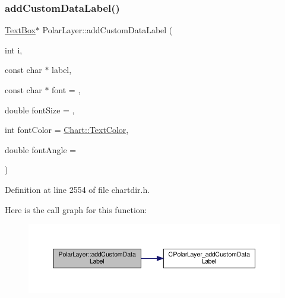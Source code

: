 \subsubsection{\texorpdfstring{add\+Custom\+Data\+Label()}{addCustomDataLabel()}}
{\footnotesize\ttfamily \hyperlink{class_text_box}{Text\+Box}$\ast$ Polar\+Layer\+::add\+Custom\+Data\+Label (\begin{DoxyParamCaption}\item[{int}]{i,  }\item[{const char $\ast$}]{label,  }\item[{const char $\ast$}]{font = {},  }\item[{double}]{font\+Size = {},  }\item[{int}]{font\+Color = {\ttfamily \hyperlink{namespace_chart_abee0d882fdc9ad0b001245ad9fc64011a879e14f2f5024caccc047374342321ef}{Chart\+::\+Text\+Color}},  }\item[{double}]{font\+Angle = {} }\end{DoxyParamCaption})\hspace{0.3cm}{\ttfamily [inline]}}



Definition at line 2554 of file chartdir.\+h.

Here is the call graph for this function\+:
\nopagebreak
\begin{figure}[H]
\begin{center}
\leavevmode
\includegraphics[width=350pt]{class_polar_layer_afacdf935ec0cd4a6c99bee27491c1078_cgraph}
\end{center}
\end{figure}
\mbox{\label{class_polar_layer_aa9ce8e1ae886b67e135b1723ba00b745}} 
